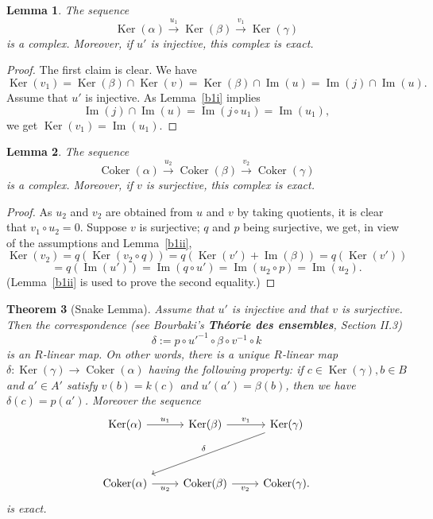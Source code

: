 \documentclass[parskip=half,fontsize=12pt]{scrartcl}%
\newcommand{\oo}{\operatorname}\newcommand{\ooo}{\operatorname*}
\newcommand{\Ker}{\operatorname{Ker}}\newcommand{\Coker}{\operatorname{Coker}}
\newcommand{\xr}{\xrightarrow}
\newtheorem{thm}{Theorem}%
\newtheorem{lem}[thm]{Lemma}
\begin{document}
\begin{lem}\label{b2i}
The sequence 
$$
\oo{Ker}(\alpha)\xr{u_1}\oo{Ker}(\beta)\xr{v_1}\oo{Ker}(\gamma)
$$ 
is a complex. Moreover, if $u'$ is injective, this complex is exact.
\end{lem}
 
\begin{proof}
The first claim is clear. We have 
$$
\oo{Ker}(v_1)=\oo{Ker}(\beta)\cap\oo{Ker}(v)=\oo{Ker}(\beta)\cap\oo{Im}(u)=\oo{Im}(j)\cap\oo{Im}(u).
$$ 
Assume that $u'$ is injective. As Lemma~\ref{b1i} implies 
$$
\oo{Im}(j)\cap\oo{Im}(u)=\oo{Im}(j\circ u_1)=\oo{Im}(u_1),
$$ 
we get $\oo{Ker}(v_1)=\oo{Im}(u_1)$.
\end{proof}

\begin{lem}\label{b2ii}
The sequence 
$$
\oo{Coker}(\alpha)\xr{u_2}\oo{Coker}(\beta)\xr{v_2}\oo{Coker}(\gamma)
$$ 
is a complex. Moreover, if $v$ is surjective, this complex is exact.
\end{lem}

\begin{proof}
As $u_2$ and $v_2$ are obtained from $u$ and $v$ by taking quotients, it is clear that $v_1\circ u_2=0$. Suppose $v$ is surjective; $q$ and $p$ being surjective, we get, in view of the assumptions and Lemma~\ref{b1ii},
$$
\oo{Ker}(v_2) = q(\oo{Ker}(v_2\circ q))= q(\oo{Ker}(v')+\oo{Im}(\beta))=q(\oo{Ker}(v'))
$$ 
$$
=q(\oo{Im}(u'))=\oo{Im}(q\circ u')=\oo{Im}(u_2\circ p)=\oo{Im}(u_2).
$$ 
(Lemma~\ref{b1ii} is used to prove the second equality.)
\end{proof} 

\begin{thm}[Snake Lemma]\label{lsl}
Assume that $u'$ is injective and that $v$ is surjective. Then the correspondence (see Bourbaki's \textbf{Théorie des ensembles}, Section II.3) 
$$
\delta:=p\circ u'^{-1}\circ\beta\circ v^{-1}\circ k
$$ 
is an $R$-linear map. On other words, there is a unique $R$-linear map $\delta:\oo{Ker}(\gamma)\to\oo{Coker}(\alpha)$ having the following property: if $c\in\oo{Ker}(\gamma),b\in B$ and $a'\in A'$ satisfy $v(b)=k(c)$ and $u'(a')= \beta(b)$, then we have $\delta(c)=p(a')$. Moreover the sequence 
$$
\begin{tikzcd}
\Ker(\alpha)\ar["u_1"]{r}&\Ker(\beta)\ar["v_1"]{r}&\Ker(\gamma)\ar["\delta"']{ddll}\\ \\ 
\Coker(\alpha)\ar["u_2"']{r}&\Coker(\beta)\ar["v_2"']{r}&\Coker(\gamma).
\end{tikzcd}
$$ 
is exact.
\end{thm}
\end{document}
